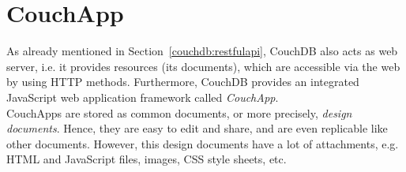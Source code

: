 \lstset{language=HTML}

\chapter{CouchApp}
\label{couchapp}
As already mentioned in Section~\ref{couchdb:restfulapi}, CouchDB also acts as web server, i.e. it provides resources (its documents), which are accessible via the web by using HTTP methods. Furthermore, CouchDB provides an integrated JavaScript web application framework called \emph{CouchApp}.\\
CouchApps are stored as common documents, or more precisely, \emph{design documents}. Hence, they are easy to edit and share, and are even replicable like other documents. However, this design documents have a lot of attachments, e.g. HTML and JavaScript files, images, CSS style sheets, etc.
